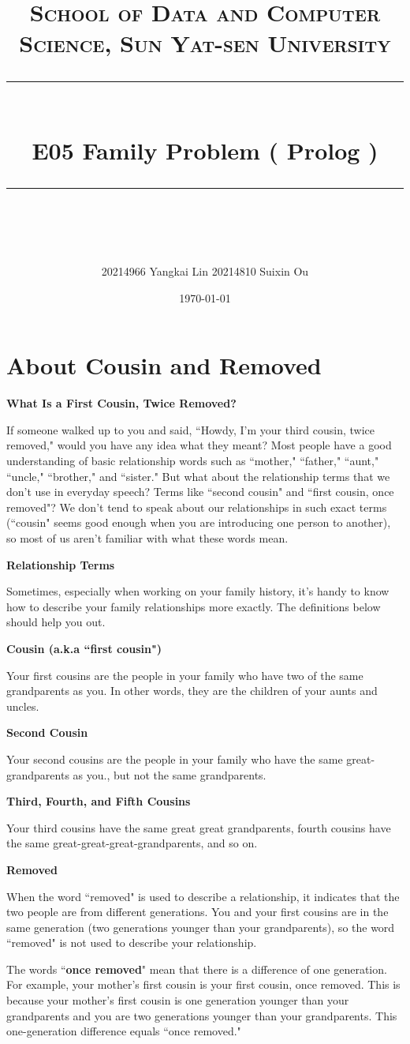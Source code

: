 ﻿\documentclass[a4paper, 11pt]{article}
\title{	
\normalfont \normalsize
\textsc{School of Data and Computer Science, Sun Yat-sen University} \\ [25pt] %
\rule{\textwidth}{0.5pt} \\[0.4cm] %
\huge  E05 Family Problem ( Prolog )\\ %
\rule{\textwidth}{2pt} \\[0.5cm] %
\author{20214966 Yangkai Lin 20214810 Suixin Ou}
\date{\normalsize\today}
}
\begin{document}
\maketitle
\tableofcontents
\newpage
\section{About Cousin and Removed}
\textbf{What Is a First Cousin, Twice Removed?}

If someone walked up to you and said, ``Howdy, I'm your third cousin, twice removed," would you have any idea what they meant? Most people have a good understanding of basic relationship words such as ``mother," ``father," ``aunt," ``uncle," ``brother," and ``sister." But what about the relationship terms that we don't use in everyday speech? Terms like ``second cousin" and ``first cousin, once removed"? We don't tend to speak about our relationships in such exact terms (``cousin" seems good enough when you are introducing one person to another), so most of us aren't familiar with what these words mean.

\textbf{Relationship Terms}

Sometimes, especially when working on your family history, it's handy to know how to describe your family relationships more exactly. The definitions below should help you out.

\textbf{Cousin (a.k.a ``first cousin")}

Your first cousins are the people in your family who have two of the same grandparents as you. In other words, they are the children of your aunts and uncles.

\textbf{Second Cousin}

Your second cousins are the people in your family who have the same great-grandparents as you., but not the same grandparents.

\textbf{Third, Fourth, and Fifth Cousins}

Your third cousins have the same great great grandparents, fourth cousins have the same great-great-great-grandparents, and so on.

\textbf{Removed}

When the word ``removed" is used to describe a relationship, it indicates that the two people are from different generations. You and your first cousins are in the same generation (two generations younger than your grandparents), so the word ``removed" is not used to describe your relationship.

The words ``\textbf{once removed}" mean that there is a difference of one generation. For example, your mother's first cousin is your first cousin, once removed. This is because your mother's first cousin is one generation younger than your grandparents and you are two generations younger than your grandparents. This one-generation difference equals ``once removed."
\end{document}
